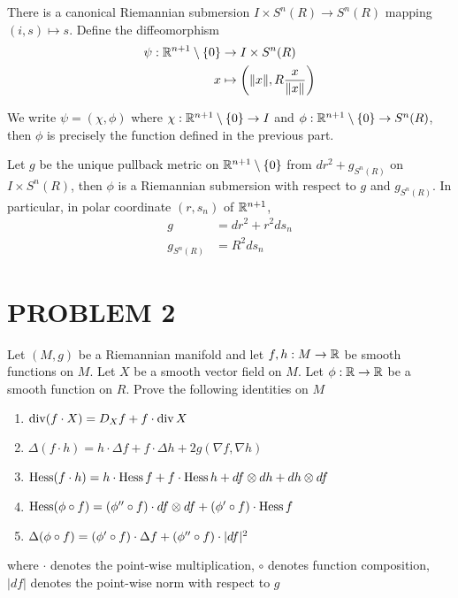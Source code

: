 There is a canonical Riemannian submersion $I \times S^n(R) \to S^n(R)$ mapping $(i, s) \mapsto s$. Define the diffeomorphism
\begin{align*}
	\psi: \R^{n+1} \setminus \set{0} &\to I \times S^n(R) \\
			x &\mapsto \tuple*{\norm{x}, R \frac{x}{\norm{x}}}
\end{align*}

We write $\psi = (\chi, \phi)$ where $\chi: \R^{n+1} \setminus \set{0} \to I$ and $\phi: \R^{n+1} \setminus \set{0} \to S^n(R)$, then $\phi$ is precisely the function defined in the previous part. 

Let $g$ be the unique pullback metric on $\R^{n+1} \setminus \set{0}$ from $dr^2 + g_{S^n(R)}$ on $I \times S^n(R)$, then $\phi$ is a Riemannian submersion with respect to $g$ and $g_{S^n(R)}$. In particular, in polar coordinate $(r, s_n)$ of $\R^{n+1}$,
\begin{align*}
	g &= dr^2 + r^2 d s_n \\
	g_{S^n(R)} &= R^2 d s_n
\end{align*}

\section{PROBLEM 2}

\begin{problem}
	Let $(M, g)$ be a Riemannian manifold and let $f, h: M \to \R$ be smooth functions on $M$. Let $X$ be a smooth vector field on $M$. Let $\phi: \R \to \R$ be a smooth function on $R$. Prove the following identities on $M$
	\begin{enumerate}[label=(\roman*)]
		\item $\Div (f \cdot X) = D_X f + f \cdot \Div X$
		\item $\Delta (f \cdot h) = h \cdot \Delta f + f \cdot \Delta h + 2g (\nabla f, \nabla h)$
		\item $\Hess (f \cdot h) = h \cdot \Hess f + f \cdot \Hess h + df \otimes dh + dh \otimes df$
		\item $\Hess (\phi \circ f) = (\phi'' \circ f) \cdot df \otimes df + (\phi' \circ f) \cdot \Hess f$
		\item $\Delta(\phi \circ f) = (\phi' \circ f) \cdot \Delta f + (\phi'' \circ f) \cdot \abs{df}^2$
	\end{enumerate}
	
	where $\cdot$ denotes the point-wise multiplication, $\circ$ denotes function composition, $|df|$ denotes the point-wise norm with respect to $g$
\end{problem}

